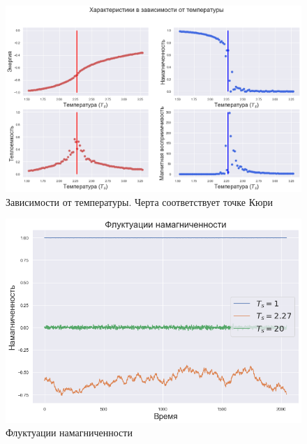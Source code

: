 \documentclass[12pt]{report}
\theoremstyle{definition}
\begin{document}
\begin{figure}[hbtp]
    \centering
    \includegraphics[scale=0.4]{img/temperature.png}
    \caption{Зависимости от температуры. Черта соответствует точке Кюри}
\end{figure}

\begin{figure}[hbtp]
    \centering
    \includegraphics[scale=0.4]{img/fluctuations.png}
    \caption{Флуктуации намагниченности}
\end{figure}
\end{document}
